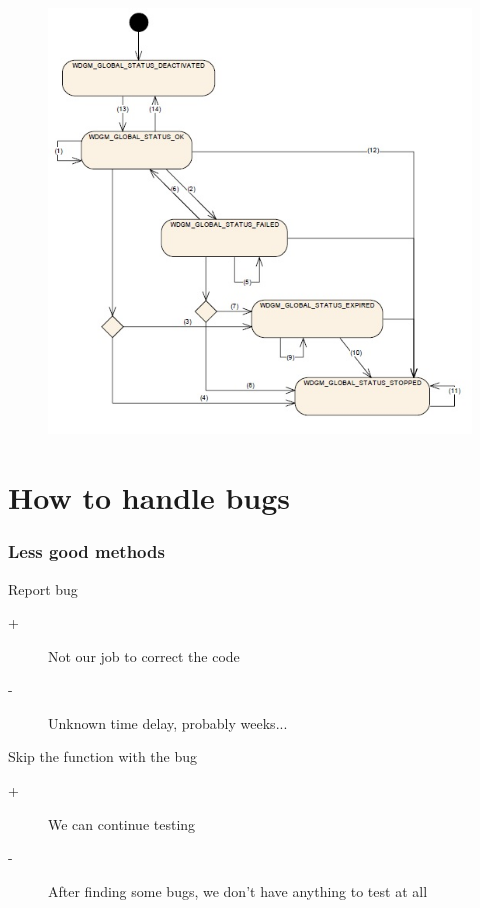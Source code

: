 \documentclass{beamer}
\begin{document}
\begin{frame}
  \begin{figure}
    \includegraphics[keepaspectratio, width=0.7\linewidth]{globalstatuses}
  \end{figure}
\end{frame}

\section{How to handle bugs}

\begin{frame}
  \frametitle{Less good methods}
  \begin{block}{Report bug}
    \begin{description}
      \item[+] Not our job to correct the code
      \item[-] Unknown time delay, probably weeks...
    \end{description}
  \end{block}

  \begin{block}{Skip the function with the bug}
    \begin{description}
      \item[+] We can continue testing
      \item[-] After finding some bugs, we don't have anything to test at all
    \end{description}
  \end{block}
\end{frame}
\end{document}
